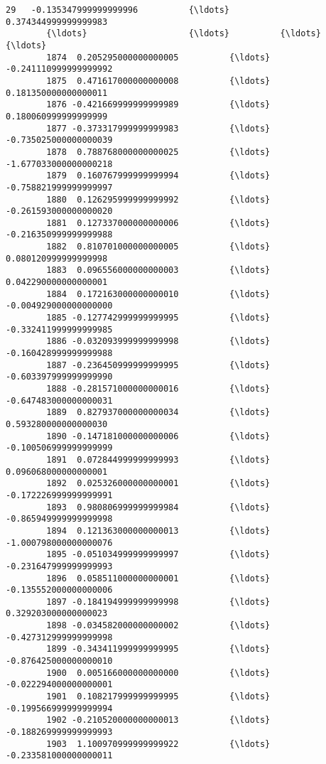 \documentclass[11pt]{article}
\begin{document}
\begin{Verbatim}[commandchars=\\\{\}]
        29   -0.135347999999999996          {\ldots}           0.374344999999999983   
        {\ldots}                    {\ldots}          {\ldots}                            {\ldots}   
        1874  0.205295000000000005          {\ldots}          -0.241110999999999992   
        1875  0.471617000000000008          {\ldots}           0.181350000000000011   
        1876 -0.421669999999999989          {\ldots}           0.180060999999999999   
        1877 -0.373317999999999983          {\ldots}          -0.735025000000000039   
        1878  0.788768000000000025          {\ldots}          -1.677033000000000218   
        1879  0.160767999999999994          {\ldots}          -0.758821999999999997   
        1880  0.126295999999999992          {\ldots}          -0.261593000000000020   
        1881  0.127337000000000006          {\ldots}          -0.216350999999999988   
        1882  0.810701000000000005          {\ldots}           0.080120999999999998   
        1883  0.096556000000000003          {\ldots}           0.042290000000000001   
        1884  0.172163000000000010          {\ldots}          -0.004929000000000000   
        1885 -0.127742999999999995          {\ldots}          -0.332411999999999985   
        1886 -0.032093999999999998          {\ldots}          -0.160428999999999988   
        1887 -0.236450999999999995          {\ldots}          -0.603397999999999990   
        1888 -0.281571000000000016          {\ldots}          -0.647483000000000031   
        1889  0.827937000000000034          {\ldots}           0.593280000000000030   
        1890 -0.147181000000000006          {\ldots}          -0.100506999999999999   
        1891  0.072844999999999993          {\ldots}           0.096068000000000001   
        1892  0.025326000000000001          {\ldots}          -0.172226999999999991   
        1893  0.980806999999999984          {\ldots}          -0.865949999999999998   
        1894  0.121363000000000013          {\ldots}          -1.000798000000000076   
        1895 -0.051034999999999997          {\ldots}          -0.231647999999999993   
        1896  0.058511000000000001          {\ldots}          -0.135552000000000006   
        1897 -0.184194999999999998          {\ldots}           0.329203000000000023   
        1898 -0.034582000000000002          {\ldots}          -0.427312999999999998   
        1899 -0.343411999999999995          {\ldots}          -0.876425000000000010   
        1900  0.005166000000000000          {\ldots}          -0.022294000000000001   
        1901  0.108217999999999995          {\ldots}          -0.199566999999999994   
        1902 -0.210520000000000013          {\ldots}          -0.188269999999999993   
        1903  1.100970999999999922          {\ldots}          -0.233581000000000011   
        

\end{Verbatim}
\end{document}
